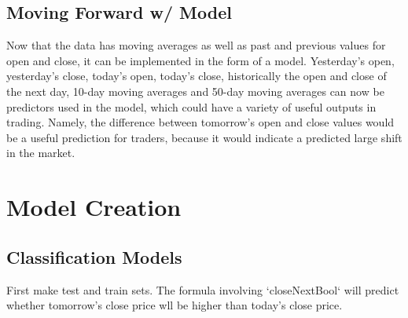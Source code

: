 \documentclass{article}\usepackage[]{graphicx}\usepackage[]{color}
\begin{document}
\begin{figure}[ht]
\begin{center}
\qquad
{}%
\end{center}
\end{figure}

\subsection{Moving Forward w/ Model}
Now that the data has moving averages as well as past and previous values for open and close, it can be implemented in the form of a model. 
Yesterday's open, yesterday's close, today's open, today's close, historically the open and close of the next day, 10-day moving averages and 50-day moving averages can now be predictors used in the model, which could have a variety of useful outputs in trading. Namely, the difference between tomorrow's open and close values would be a useful prediction for traders, because it would indicate a predicted large shift in the market.

\section{Model Creation}
\subsection{Classification Models}
First make test and train sets.
The formula involving `closeNextBool` will predict whether tomorrow's close price wll be higher than today's close price.
\end{document}
